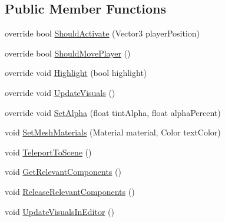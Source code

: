 \subsection*{Public Member Functions}
\begin{DoxyCompactItemize}
\item 
override bool \mbox{\hyperlink{class_valve_1_1_v_r_1_1_interaction_system_1_1_teleport_point_a3a5e0dae80f7d66fbffce006b3c0ab72}{Should\+Activate}} (Vector3 player\+Position)
\item 
override bool \mbox{\hyperlink{class_valve_1_1_v_r_1_1_interaction_system_1_1_teleport_point_a27ab68b130e5ccc824ed7e93a7b880b8}{Should\+Move\+Player}} ()
\item 
override void \mbox{\hyperlink{class_valve_1_1_v_r_1_1_interaction_system_1_1_teleport_point_ad959cfb62361bc7b3b43d76a806d7bc7}{Highlight}} (bool highlight)
\item 
override void \mbox{\hyperlink{class_valve_1_1_v_r_1_1_interaction_system_1_1_teleport_point_aa62afea7412cbca6a7e5016b4a5788c6}{Update\+Visuals}} ()
\item 
override void \mbox{\hyperlink{class_valve_1_1_v_r_1_1_interaction_system_1_1_teleport_point_a3ed605b7757540a5b6225716c18ee090}{Set\+Alpha}} (float tint\+Alpha, float alpha\+Percent)
\item 
void \mbox{\hyperlink{class_valve_1_1_v_r_1_1_interaction_system_1_1_teleport_point_aea7e2c7f46242c8ce67249b94309915a}{Set\+Mesh\+Materials}} (Material material, Color text\+Color)
\item 
void \mbox{\hyperlink{class_valve_1_1_v_r_1_1_interaction_system_1_1_teleport_point_accbee6fb350019c7f18d72193fa085fb}{Teleport\+To\+Scene}} ()
\item 
void \mbox{\hyperlink{class_valve_1_1_v_r_1_1_interaction_system_1_1_teleport_point_aed4750e01ea0be08cf80d98679b7bc9a}{Get\+Relevant\+Components}} ()
\item 
void \mbox{\hyperlink{class_valve_1_1_v_r_1_1_interaction_system_1_1_teleport_point_a018ebad25bd2d5b4196af3e490dfe868}{Release\+Relevant\+Components}} ()
\item 
void \mbox{\hyperlink{class_valve_1_1_v_r_1_1_interaction_system_1_1_teleport_point_a1389539bcb637fce7f8622b5c06c37ec}{Update\+Visuals\+In\+Editor}} ()
\end{DoxyCompactItemize}
